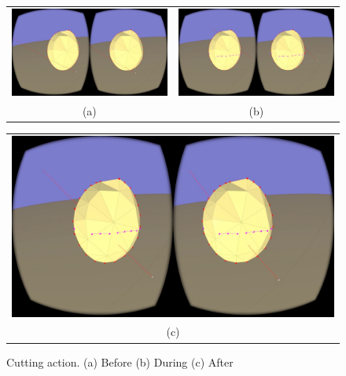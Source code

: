 \begin{figure}[!h]
    \centering
    \setlength{\tabcolsep}{0.0130\linewidth}
    \begin{tabular}{@{}cc@{}}
    \includegraphics[width=0.45\linewidth]{figures/pre_cut} &
       	\includegraphics[width=0.45\linewidth]{figures/during_cut} \\
       	(a)&(b)\\
       	\end{tabular}
       	
       	  \centering
    \setlength{\tabcolsep}{0.0130\linewidth}
    \begin{tabular}{@{}c@{}}
    \includegraphics[width=0.926\linewidth]{figures/post_cut}\\
    (c)
    \end{tabular}
    \caption[Cutting action]{Cutting action.
    	  \textup{(a)} Before \textup{(b)} During \textup{(c)} After
      \label{fig:cut_example}}
\end{figure}



